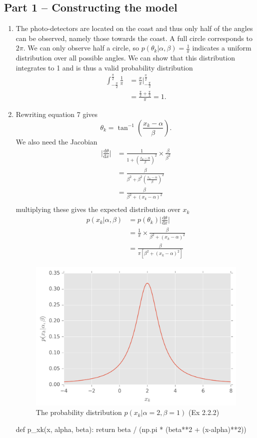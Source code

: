 \documentclass{article}
\begin{document}
\subsection*{Part 1 -- Constructing the model}
\begin{enumerate}
\item 
The photo-detectors are located on the coast and thus only half of the angles can be observed, namely those towards the coast. A full circle corresponds to $2\pi$. We can only observe half a circle, so $p(\theta_k|\alpha, \beta) = \frac{1}{\pi}$ indicates a uniform distribution over all possible angles. We can show that this distribution integrates to 1 and is thus a valid probability distribution
\begin{align*}
\int_{-\frac{\pi}{2}}^{\frac{\pi}{2}}\frac{1}{\pi} &= \frac{x}{\pi}\Big|_{-\frac{\pi}{2}}^{\frac{\pi}{2}} \\
&= \frac{\frac{\pi}{2} + \frac{\pi}{2}}{\pi} = 1.
\end{align*}
\item 
Rewriting equation 7 gives
$$
\theta_k = \tan^{-1}(\frac{x_k - \alpha}{\beta}).
$$
We also need the Jacobian
\begin{align*}
\big|\frac{\text{d}\theta}{\text{d}x}\big| &= \frac{1}{1+(\frac{x_k - \alpha}{\beta})^2} \times \frac{\beta}{\beta^2} \\
&= \frac{\beta}{\beta^2+\beta^2(\frac{x_k - \alpha}{\beta})^2} \\
&= \frac{\beta}{\beta^2+(x_k - \alpha)^2} \\
\end{align*}
multiplying these gives the expected distribution over $x_k$
\begin{align*}
p(x_k | \alpha, \beta) &= p(\theta_k)\bigg|\frac{\text{d}\theta}{\text{d}x}\bigg| \\
&= \frac{1}{\pi} \times \frac{\beta}{\beta^2+(x_k - \alpha)^2} \\
&= \frac{\beta}{\pi[\beta^2+(x_k - \alpha)^2]}
\end{align*}
\begin{figure}[H]
\centering
\includegraphics[width=.6\textwidth]{images/prob_xk.png}
\caption{The probability distribution $p(x_k | \alpha=2, \beta=1)$ (Ex 2.2.2)}
\end{figure}
\begin{python}
def p_xk(x, alpha, beta):
    return beta / (np.pi * (beta**2 + (x-alpha)**2))


\end{python}
\end{enumerate}
\end{document}
